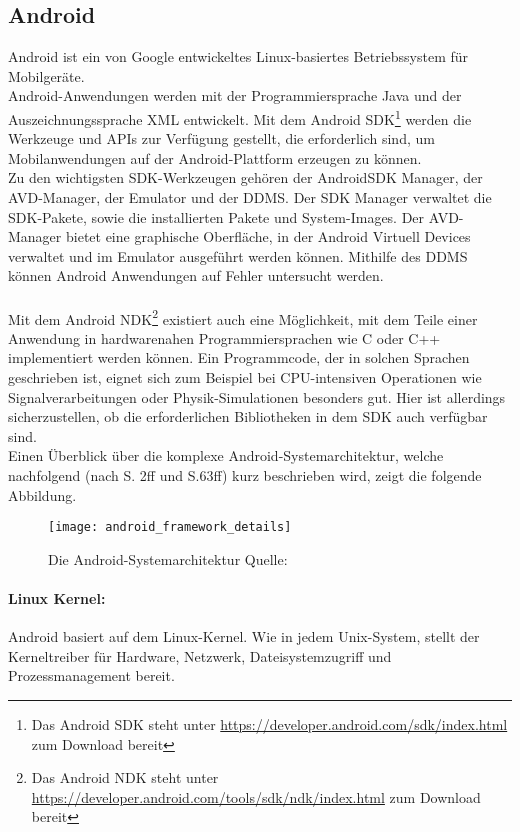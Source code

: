 \subsection{Android}
Android ist ein von Google entwickeltes Linux-basiertes Betriebssystem für Mobilgeräte.\\ 
Android-Anwendungen werden mit der Programmiersprache Java und der Auszeichnungssprache \gls{XML} entwickelt. Mit dem Android \gls{SDK}\footnote{ Das Android \gls{SDK} steht unter \url{https://developer.android.com/sdk/index.html} zum Download bereit} werden die Werkzeuge und \glspl{API} zur Verfügung gestellt, die erforderlich sind, um Mobilanwendungen auf der Android-Plattform erzeugen zu können.\\ 
Zu den wichtigsten \gls{SDK}-Werkzeugen gehören der Android\gls{SDK} Manager, der AVD-Manager, der Emulator und der \gls{DDMS}. Der \gls{SDK} Manager verwaltet die \gls{SDK}-Pakete, sowie die installierten Pakete und System-Images. Der AVD-Manager bietet eine graphische Oberfläche, in der Android Virtuell Devices verwaltet und im Emulator ausgeführt werden können. Mithilfe des \gls{DDMS} können Android Anwendungen auf Fehler untersucht werden. \cite{android_sdk} \\\\
Mit dem Android \gls{NDK}\footnote{ Das Android \gls{NDK} steht unter \url{https://developer.android.com/tools/sdk/ndk/index.html} zum Download bereit} existiert auch eine Möglichkeit, mit dem Teile einer Anwendung in hardwarenahen Programmiersprachen wie C oder C++ implementiert werden können. Ein Programmcode, der in solchen Sprachen geschrieben ist, eignet sich zum Beispiel bei CPU-intensiven Operationen wie Signalverarbeitungen oder Physik-Simulationen besonders gut. Hier ist allerdings sicherzustellen, ob die erforderlichen Bibliotheken in dem \gls{SDK} auch verfügbar sind. \cite{android_ndk} \\
Einen Überblick über die komplexe Android-Systemarchitektur, welche nachfolgend (nach \cite{android} S. 2ff und \cite{androidVM} S.63ff) kurz beschrieben wird, zeigt die folgende Abbildung.\\
\begin{figure}[H]  
    \centering  
    \texttt{[image: android\_framework\_details]} 
    \grayRule
    \caption[Android-Systemarchitektur]{Die Android-Systemarchitektur Quelle: \cite{android_fig}}
    \label{fig:android}
\end{figure}
\paragraph{Linux Kernel: }
Android basiert auf dem Linux-Kernel. Wie in jedem Unix-System, stellt der Kerneltreiber für Hardware, Netzwerk, Dateisystemzugriff und Prozessmanagement bereit.
